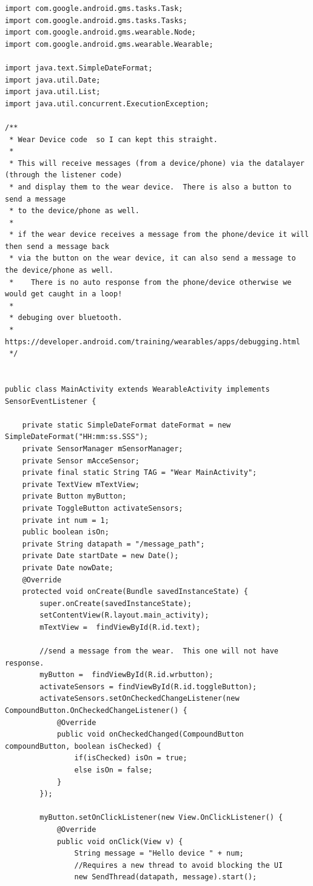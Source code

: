 \documentclass[12pt]{book}
\numberwithin{equation}{section}
\begin{document}
\begin{appendices}
\begin{verbatim}
import com.google.android.gms.tasks.Task;
import com.google.android.gms.tasks.Tasks;
import com.google.android.gms.wearable.Node;
import com.google.android.gms.wearable.Wearable;

import java.text.SimpleDateFormat;
import java.util.Date;
import java.util.List;
import java.util.concurrent.ExecutionException;

/**
 * Wear Device code  so I can kept this straight.
 *
 * This will receive messages (from a device/phone) via the datalayer (through the listener code)
 * and display them to the wear device.  There is also a button to send a message
 * to the device/phone as well.
 *
 * if the wear device receives a message from the phone/device it will then send a message back
 * via the button on the wear device, it can also send a message to the device/phone as well.
 *    There is no auto response from the phone/device otherwise we would get caught in a loop!
 *
 * debuging over bluetooth.
 * https://developer.android.com/training/wearables/apps/debugging.html
 */


public class MainActivity extends WearableActivity implements SensorEventListener {

    private static SimpleDateFormat dateFormat = new SimpleDateFormat("HH:mm:ss.SSS");
    private SensorManager mSensorManager;
    private Sensor mAcceSensor;
    private final static String TAG = "Wear MainActivity";
    private TextView mTextView;
    private Button myButton;
    private ToggleButton activateSensors;
    private int num = 1;
    public boolean isOn;
    private String datapath = "/message_path";
    private Date startDate = new Date();
    private Date nowDate;
    @Override
    protected void onCreate(Bundle savedInstanceState) {
        super.onCreate(savedInstanceState);
        setContentView(R.layout.main_activity);
        mTextView =  findViewById(R.id.text);

        //send a message from the wear.  This one will not have response.
        myButton =  findViewById(R.id.wrbutton);
        activateSensors = findViewById(R.id.toggleButton);
        activateSensors.setOnCheckedChangeListener(new CompoundButton.OnCheckedChangeListener() {
            @Override
            public void onCheckedChanged(CompoundButton compoundButton, boolean isChecked) {
                if(isChecked) isOn = true;
                else isOn = false;
            }
        });

        myButton.setOnClickListener(new View.OnClickListener() {
            @Override
            public void onClick(View v) {
                String message = "Hello device " + num;
                //Requires a new thread to avoid blocking the UI
                new SendThread(datapath, message).start();


\end{verbatim}
\end{appendices}
\end{document}
